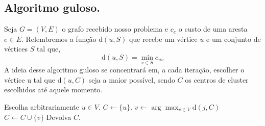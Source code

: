 \documentclass[12pt]{article}
\begin{document}
\newpage
\subsection{Algoritmo guloso.}
    Seja $G = (V,E)$ o grafo recebido nosso problema e $c_e$ o custo de uma aresta $e \in E$.
    Relembremos a função d$(u,S)$ que recebe um vértice $u$ e um conjunto de vértices $S$ tal que,
    \[ \text{d}(u,S) = \min_{v\in S} c_{uv}
        \]
    A ideia desse algoritmo guloso se concentrará em, a cada iteração, escolher o vértice u tal que d$(u,C)$ seja a maior possível, sendo $C$ os centros de cluster escolhidos até aquele momento.

    \begin{algorithm}
		\begin{algorithmic}[1]
			\State Escolha arbitrariamente $u \in V$.
            \State $C \gets \{u\}$.
            \State $v \gets \arg\max_{v \in V} \text{d}(j,C)$
            \State $C \gets C \cup \{v\}$
            \EndWhile 
			\State Devolva $C$.
			\EndFunction
		\end{algorithmic}
	\end{algorithm}
    
\end{document}
